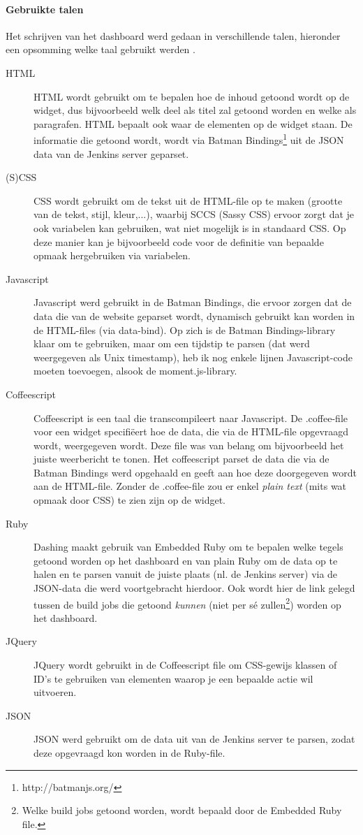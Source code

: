 \documentclass[10pt,a4paper]{article}
\begin{document}
\paragraph{Gebruikte talen}
Het schrijven van het dashboard werd gedaan in verschillende talen, hieronder een opsomming welke taal gebruikt werden .
\begin{description}
\item[HTML] HTML wordt gebruikt om te bepalen hoe de inhoud getoond wordt op de widget, dus bijvoorbeeld welk deel als titel zal getoond worden en welke als paragrafen. HTML bepaalt ook waar de elementen op de widget staan. De informatie die getoond wordt, wordt via Batman Bindings\footnote{http://batmanjs.org/} uit de JSON data van de Jenkins server geparset. 
\item[(S)CSS] CSS wordt gebruikt om de tekst uit de HTML-file op te maken (grootte van de tekst, stijl, kleur,...), waarbij SCCS (Sassy CSS) ervoor zorgt dat je ook variabelen kan gebruiken, wat niet mogelijk is in standaard CSS. Op deze manier kan je bijvoorbeeld code voor de definitie van bepaalde opmaak hergebruiken via variabelen. 
\item[Javascript] Javascript werd gebruikt in de Batman Bindings, die ervoor zorgen dat de data die van de website geparset wordt, dynamisch gebruikt kan worden in de HTML-files (via data-bind). Op zich is de Batman Bindings-library klaar om te gebruiken, maar om een tijdstip te parsen (dat werd weergegeven als Unix timestamp), heb ik nog enkele lijnen Javascript-code moeten toevoegen, alsook de moment.js-library.
\item[Coffeescript] Coffeescript is een taal die transcompileert naar Javascript. De .coffee-file voor een widget specifi\"eert hoe de data, die via de HTML-file opgevraagd wordt, weergegeven wordt. Deze file was van belang om bijvoorbeeld het juiste weerbericht te tonen. Het coffeescript parset de data die via de Batman Bindings werd opgehaald en geeft aan hoe deze doorgegeven wordt aan de HTML-file. Zonder de .coffee-file zou er enkel \textit{plain text} (mits wat opmaak door CSS) te zien zijn op de widget.
\item[Ruby] Dashing maakt gebruik van Embedded Ruby om te bepalen welke tegels getoond worden op het dashboard en van plain Ruby om de data op te halen en te parsen vanuit de juiste plaats (nl. de Jenkins server) via de JSON-data die werd voortgebracht hierdoor. Ook wordt hier de link gelegd tussen de build jobs die getoond \emph{kunnen} (niet per s\'e zullen\footnote{Welke build jobs getoond worden, wordt bepaald door de Embedded Ruby file.}) worden op het dashboard.
\item[JQuery] JQuery wordt gebruikt in de Coffeescript file om CSS-gewijs klassen of ID's te gebruiken van elementen waarop je een bepaalde actie wil uitvoeren.
\item[JSON] JSON werd gebruikt om de data uit van de Jenkins server te parsen, zodat deze opgevraagd kon worden in de Ruby-file.
\end{description}
\end{document}
